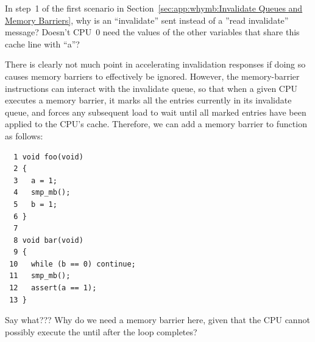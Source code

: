 \QuickQuiz{}
	In step~1 of the first scenario in
	Section~\ref{sec:app:whymb:Invalidate Queues and Memory Barriers},
	why is an ``invalidate'' sent instead of a ''read invalidate''
	message?
	Doesn't CPU~0 need the values of the other variables that share
	this cache line with ``a''?
 \QuickQuizEnd

There is clearly not much point in accelerating invalidation responses
if doing so causes memory barriers to effectively be ignored.
However, the memory-barrier instructions can interact with
the invalidate queue, so that when a given CPU executes a memory
barrier, it marks all the entries currently in its invalidate queue,
and forces any subsequent load to wait until all marked entries
have been applied to the CPU's cache.
Therefore, we can add a memory barrier to function  as follows:

\vspace{5pt}
\begin{minipage}[t]{\columnwidth}
\small
\begin{verbatim}
  1 void foo(void)
  2 {
  3   a = 1;
  4   smp_mb();
  5   b = 1;
  6 }
  7
  8 void bar(void)
  9 {
 10   while (b == 0) continue;
 11   smp_mb();
 12   assert(a == 1);
 13 }
\end{verbatim}
\end{minipage}
\vspace{5pt}

\QuickQuiz{}
	Say what???
	Why do we need a memory barrier here, given that the CPU cannot
	possibly execute the  until after the
	 loop completes?
 \QuickQuizEnd

